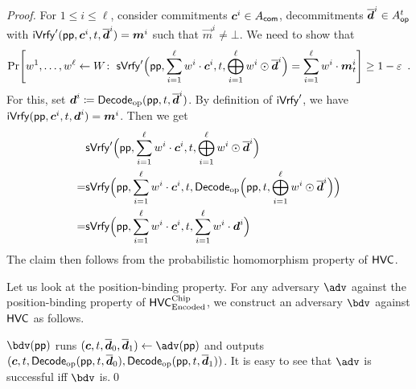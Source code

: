 \begin{proof}
For $1\leq i \leq \ell$, consider commitments $\boldsymbol{c}^i\in A_{\mathsf{com}}$, decommitments $\overline{\boldsymbol{d}}^i\in A_{\mathsf{op}}^{t}$ with $\mathsf{iVrfy}'(\mathsf{pp}, \boldsymbol{c}^i,t,\overline{\boldsymbol{d}}^i) = \boldsymbol{m}^i$ such that $\vec{m}^i\neq \bot$.
We need to show that 
\[
    \Pr\mleft[
      w^1,\dots,w^{\ell} \gets W\colon\;
      \sverify'\Bigl(\params,\sum_{i=1}^{\ell}w^i\cdot \vec{c}^i,t,\bigoplus_{i=1}^{\ell}w^i\odot\overline{\vec{d}}^i\Bigr)
      = \sum_{i=1}^{\ell}w^i\cdot\vec{m}^i_{t}
    \mright] \geq 1-\errorbound \enspace.
\]
For this, set $\boldsymbol{d}^i\coloneqq \mathsf{Decode}_{\mathrm{op}}(\mathsf{pp}, t, \overline{\boldsymbol{d}}^i)$. By definition of $\mathsf{iVrfy}'$, we have $\mathsf{iVrfy}(\mathsf{pp}, \boldsymbol{c}^i, t, \boldsymbol{d}^i) = \boldsymbol{m}^i$. Then we get
\begin{align*}
  &\mathsf{sVrfy}'\Bigl(\mathsf{pp},\sum_{i=1}^{\ell}w^i\cdot \boldsymbol{c}^i,t,                             \bigoplus_{i=1}^{\ell}w^i\odot\overline{\boldsymbol{d}}^i        \Bigr)\\
 =&\mathsf{sVrfy} \Bigl(\mathsf{pp},\sum_{i=1}^{\ell}w^i\cdot \boldsymbol{c}^i,t,\mathsf{Decode}_{\mathrm{op}}\Bigl(\mathsf{pp}, t, \bigoplus_{i=1}^{\ell}w^i\odot\overline{\boldsymbol{d}}^i \Bigr) \Bigr)\\
 =&\mathsf{sVrfy} \Bigl(\mathsf{pp},\sum_{i=1}^{\ell}w^i\cdot \boldsymbol{c}^i,t,                                  \sum_{i=1}^{\ell}w^i\cdot          \boldsymbol{d}^i         \Bigr)\\
\end{align*}
The claim then follows from the probabilistic homomorphism property of $\mathsf{HVC}$.

Let us look at the position-binding property. For any adversary $\adv$ against the position-binding property of $\mathsf{HVC}_{\textup{Encoded}}^{\textup{Chip}}$, we construct an adversary $\bdv$ against $\mathsf{HVC}$ as follows.

$\bdv(\params)$ runs $(\vec{c}, t, \overline{\vec{d}}_0,\overline{\vec{d}}_1)\gets\adv(\params)$ and outputs $(\boldsymbol{c}, t, \mathsf{Decode}_{\mathrm{op}}(\mathsf{pp}, t,\overline{\boldsymbol{d}}_0), \mathsf{Decode}_{\mathrm{op}}(\mathsf{pp}, t, \overline{\boldsymbol{d}}_1))$. It is easy to see that $\adv$ is successful iff $\bdv$ is.\qed
\end{proof}

